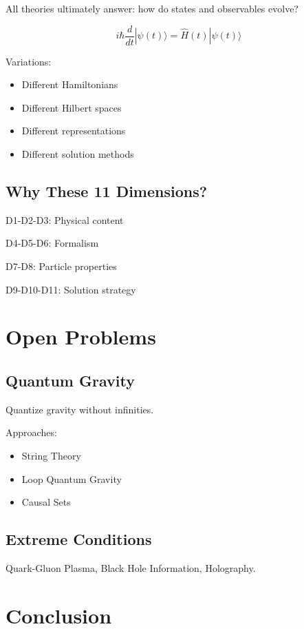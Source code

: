 \documentclass[12pt]{book}
\begin{document}
All theories ultimately answer: how do states and observables evolve?

$$i\hbar\frac{d}{dt}|\psi(t)\rangle = \hat{H}(t)|\psi(t)\rangle$$

Variations:
\begin{itemize}
  \item Different Hamiltonians
  \item Different Hilbert spaces
  \item Different representations
  \item Different solution methods
\end{itemize}

\section{Why These 11 Dimensions?}

D1-D2-D3: Physical content

D4-D5-D6: Formalism

D7-D8: Particle properties

D9-D10-D11: Solution strategy

\chapter{Open Problems}

\section{Quantum Gravity}

Quantize gravity without infinities.

Approaches:
\begin{itemize}
  \item String Theory
  \item Loop Quantum Gravity
  \item Causal Sets
\end{itemize}

\section{Extreme Conditions}

Quark-Gluon Plasma, Black Hole Information, Holography.

\chapter{Conclusion}
\end{document}
